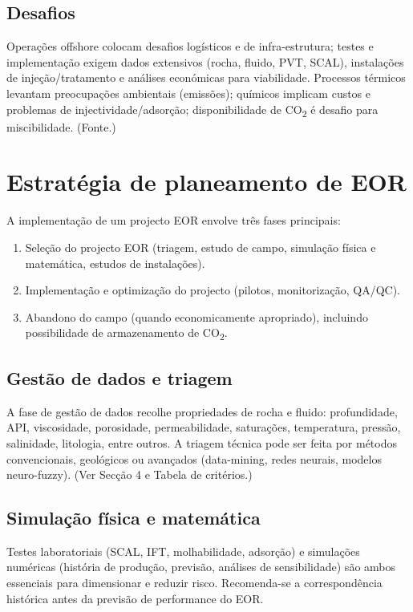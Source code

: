 \documentclass[11pt,a4paper]{article}
\begin{document}
\subsection{Desafios}
Operações offshore colocam desafios logísticos e de infra-estrutura; testes e implementação exigem dados extensivos (rocha, fluido, PVT, SCAL), instalações de injeção/tratamento e análises económicas para viabilidade. Processos térmicos levantam preocupações ambientais (emissões); químicos implicam custos e problemas de injectividade/adsorção; disponibilidade de CO\textsubscript{2} é desafio para miscibilidade. (Fonte.)

\section{Estratégia de planeamento de EOR}
A implementação de um projecto EOR envolve três fases principais:
\begin{enumerate}
  \item Seleção do projecto EOR (triagem, estudo de campo, simulação física e matemática, estudos de instalações).
  \item Implementação e optimização do projecto (pilotos, monitorização, QA/QC).
  \item Abandono do campo (quando economicamente apropriado), incluindo possibilidade de armazenamento de CO\textsubscript{2}.
\end{enumerate}

\subsection{Gestão de dados e triagem}
A fase de gestão de dados recolhe propriedades de rocha e fluido: profundidade, API, viscosidade, porosidade, permeabilidade, saturações, temperatura, pressão, salinidade, litologia, entre outros. A triagem técnica pode ser feita por métodos convencionais, geológicos ou avançados (data-mining, redes neurais, modelos neuro-fuzzy). (Ver Secção 4 e Tabela de critérios.)

\subsection{Simulação física e matemática}
Testes laboratoriais (SCAL, IFT, molhabilidade, adsorção) e simulações numéricas (história de produção, previsão, análises de sensibilidade) são ambos essenciais para dimensionar e reduzir risco. Recomenda-se a correspondência histórica antes da previsão de performance do EOR.
\end{document}
